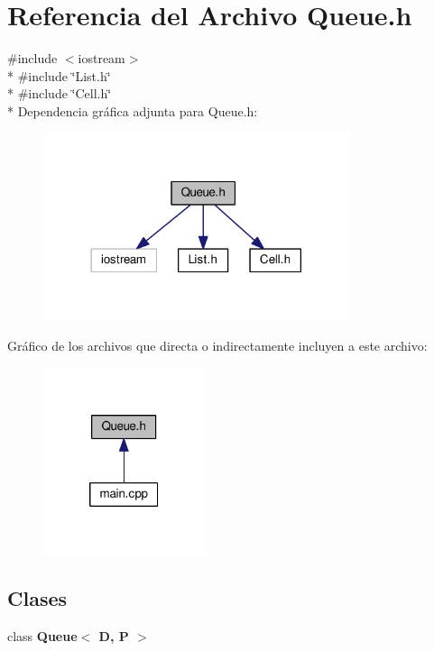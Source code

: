 \section{Referencia del Archivo Queue.\-h}
\label{_queue_8h}
{\ttfamily \#include $<$iostream$>$}\\*
{\ttfamily \#include \char`\"{}List.\-h\char`\"{}}\\*
{\ttfamily \#include \char`\"{}Cell.\-h\char`\"{}}\\*
Dependencia gráfica adjunta para Queue.\-h\-:\nopagebreak
\begin{figure}[H]
\begin{center}
\leavevmode
\includegraphics[width=254pt]{_queue_8h__incl}
\end{center}
\end{figure}
Gráfico de los archivos que directa o indirectamente incluyen a este archivo\-:\nopagebreak
\begin{figure}[H]
\begin{center}
\leavevmode
\includegraphics[width=134pt]{_queue_8h__dep__incl}
\end{center}
\end{figure}
\subsection*{Clases}
\begin{DoxyCompactItemize}
\item 
class {\bf Queue$<$ D, P $>$}
\end{DoxyCompactItemize}
